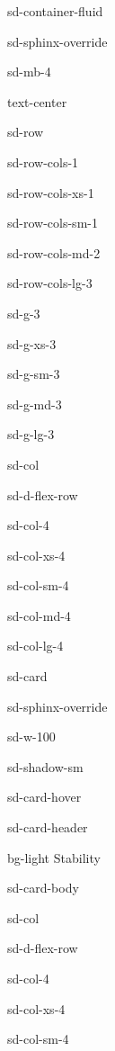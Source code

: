 \documentclass[letterpaper,10pt,english]{jupyterBook}
\begin{document}
\begin{sphinxuseclass}{sd-container-fluid}
\begin{sphinxuseclass}{sd-sphinx-override}
\begin{sphinxuseclass}{sd-mb-4}
\begin{sphinxuseclass}{text-center}
\begin{sphinxuseclass}{sd-row}
\begin{sphinxuseclass}{sd-row-cols-1}
\begin{sphinxuseclass}{sd-row-cols-xs-1}
\begin{sphinxuseclass}{sd-row-cols-sm-1}
\begin{sphinxuseclass}{sd-row-cols-md-2}
\begin{sphinxuseclass}{sd-row-cols-lg-3}
\begin{sphinxuseclass}{sd-g-3}
\begin{sphinxuseclass}{sd-g-xs-3}
\begin{sphinxuseclass}{sd-g-sm-3}
\begin{sphinxuseclass}{sd-g-md-3}
\begin{sphinxuseclass}{sd-g-lg-3}
\begin{sphinxuseclass}{sd-col}
\begin{sphinxuseclass}{sd-d-flex-row}
\begin{sphinxuseclass}{sd-col-4}
\begin{sphinxuseclass}{sd-col-xs-4}
\begin{sphinxuseclass}{sd-col-sm-4}
\begin{sphinxuseclass}{sd-col-md-4}
\begin{sphinxuseclass}{sd-col-lg-4}
\begin{sphinxuseclass}{sd-card}
\begin{sphinxuseclass}{sd-sphinx-override}
\begin{sphinxuseclass}{sd-w-100}
\begin{sphinxuseclass}{sd-shadow-sm}
\begin{sphinxuseclass}{sd-card-hover}
\begin{sphinxuseclass}{sd-card-header}
\begin{sphinxuseclass}{bg-light}
\sphinxAtStartPar
Stability

\end{sphinxuseclass}
\end{sphinxuseclass}
\begin{sphinxuseclass}{sd-card-body}
\begin{figure}[htbp]
\centering

\noindent{}
\end{figure}

\end{sphinxuseclass}{\hyperref[\detokenize{4_Stability/4.0_Stability::doc}]{}}
\end{sphinxuseclass}
\end{sphinxuseclass}
\end{sphinxuseclass}
\end{sphinxuseclass}
\end{sphinxuseclass}
\end{sphinxuseclass}
\end{sphinxuseclass}
\end{sphinxuseclass}
\end{sphinxuseclass}
\end{sphinxuseclass}
\end{sphinxuseclass}
\end{sphinxuseclass}
\begin{sphinxuseclass}{sd-col}
\begin{sphinxuseclass}{sd-d-flex-row}
\begin{sphinxuseclass}{sd-col-4}
\begin{sphinxuseclass}{sd-col-xs-4}
\begin{sphinxuseclass}{sd-col-sm-4}

\end{sphinxuseclass}
\end{sphinxuseclass}
\end{sphinxuseclass}
\end{sphinxuseclass}
\end{sphinxuseclass}
\end{sphinxuseclass}
\end{sphinxuseclass}
\end{sphinxuseclass}
\end{sphinxuseclass}
\end{sphinxuseclass}
\end{sphinxuseclass}
\end{sphinxuseclass}
\end{sphinxuseclass}
\end{sphinxuseclass}
\end{sphinxuseclass}
\end{sphinxuseclass}
\end{sphinxuseclass}
\end{sphinxuseclass}
\end{sphinxuseclass}
\end{sphinxuseclass}
\end{document}
